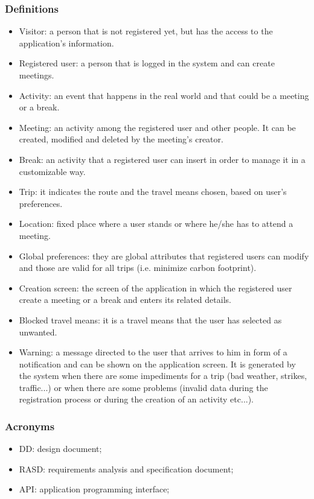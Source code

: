 \documentclass[12pt,titlepage]{article}
\begin{document}
\subsubsection{Definitions} 
\begin{itemize}
\item Visitor: a person that is not registered yet, but has the access to the application's information.
\item Registered user: a person that is logged in the system and can create meetings.
\item Activity: an event that happens in the real world and that could be a meeting or a break.
\item Meeting: an activity among the registered user and other people. It can be created, modified and deleted by the meeting's creator.
\item Break: an activity that a registered user can insert in order to manage it in a customizable way.
\item Trip: it indicates the route and the travel means chosen, based on user's preferences.
\item Location: fixed place where a user stands or where he/she has to attend a meeting.
\item Global preferences: they are global attributes that registered users can modify and those are valid for all trips (i.e. minimize carbon footprint).
\item Creation screen: the screen of the application in which the registered user create a meeting or a break and enters its related details.
\item Blocked travel means: it is a travel means that the user has selected as unwanted.
\item Warning: a message directed to the user that arrives to him in form of a notification and can be shown on the application screen. It is generated by the system when there are some impediments for a trip (bad weather, strikes, traffic...) or when there are some problems (invalid data during the registration process or during the creation of an activity etc...).
\end{itemize}
\subsubsection{Acronyms}
\begin{itemize}
\item DD: design document;
\item RASD: requirements analysis and specification document;
\item API: application programming interface;
\end{itemize}
\end{document}
